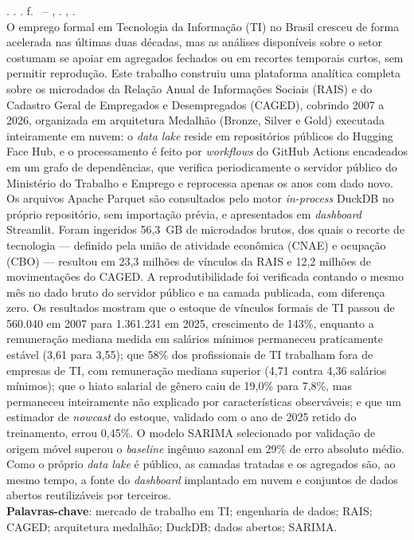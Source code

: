
\begin{resumo}[RESUMO]
\begin{SingleSpacing}

\imprimirautorcitacao. \imprimirtitulo. \imprimirdata. \pageref{LastPage} f. \imprimirprojeto\ -- \imprimirprograma, \imprimirinstituicao. \imprimirlocal, \imprimirdata.\\

O emprego formal em Tecnologia da Informação (TI) no Brasil cresceu de forma acelerada nas últimas duas décadas, mas as análises disponíveis sobre o setor costumam se apoiar em agregados fechados ou em recortes temporais curtos, sem permitir reprodução. Este trabalho construiu uma plataforma analítica completa sobre os microdados da Relação Anual de Informações Sociais (RAIS) e do Cadastro Geral de Empregados e Desempregados (CAGED), cobrindo 2007 a 2026, organizada em arquitetura Medalhão (Bronze, Silver e Gold) executada inteiramente em nuvem: o \textit{data lake} reside em repositórios públicos do Hugging Face Hub, e o processamento é feito por \textit{workflows} do GitHub Actions encadeados em um grafo de dependências, que verifica periodicamente o servidor público do Ministério do Trabalho e Emprego e reprocessa apenas os anos com dado novo. Os arquivos Apache Parquet são consultados pelo motor \textit{in-process} DuckDB no próprio repositório, sem importação prévia, e apresentados em \textit{dashboard} Streamlit. Foram ingeridos 56,3~GB de microdados brutos, dos quais o recorte de tecnologia --- definido pela união de atividade econômica (CNAE) e ocupação (CBO) --- resultou em 23,3 milhões de vínculos da RAIS e 12,2 milhões de movimentações do CAGED. A reprodutibilidade foi verificada contando o mesmo mês no dado bruto do servidor público e na camada publicada, com diferença zero. Os resultados mostram que o estoque de vínculos formais de TI passou de 560.040 em 2007 para 1.361.231 em 2025, crescimento de 143\%, enquanto a remuneração mediana medida em salários mínimos permaneceu praticamente estável (3,61 para 3,55); que 58\% dos profissionais de TI trabalham fora de empresas de TI, com remuneração mediana superior (4,71 contra 4,36 salários mínimos); que o hiato salarial de gênero caiu de 19,0\% para 7,8\%, mas permaneceu inteiramente não explicado por características observáveis; e que um estimador de \textit{nowcast} do estoque, validado com o ano de 2025 retido do treinamento, errou 0,45\%. O modelo SARIMA selecionado por validação de origem móvel superou o \textit{baseline} ingênuo sazonal em 29\% de erro absoluto médio. Como o próprio \textit{data lake} é público, as camadas tratadas e os agregados são, ao mesmo tempo, a fonte do \textit{dashboard} implantado em nuvem e conjuntos de dados abertos reutilizáveis por terceiros.\\

\textbf{Palavras-chave}: mercado de trabalho em TI; engenharia de dados; RAIS; CAGED; arquitetura medalhão; DuckDB; dados abertos; SARIMA.

\end{SingleSpacing}
\end{resumo}
